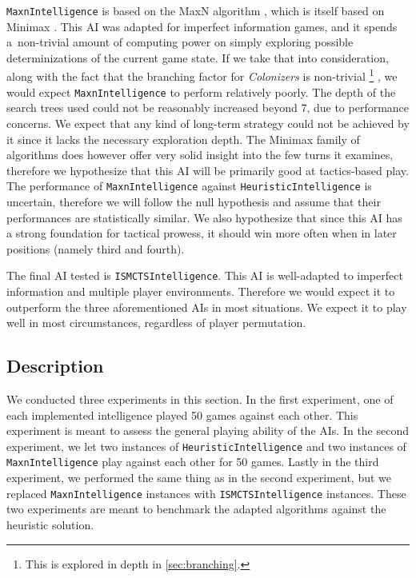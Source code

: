 \texttt{MaxnIntelligence} is based on the MaxN algorithm \cite{Luckhardt86}, which
is itself based on Minimax \cite{Millington09}. This AI was adapted for imperfect
information games, and it spends a~non-trivial amount of computing power
on simply exploring possible determinizations of the current game state.
If we take that into consideration, along with the fact that the branching factor
for \emph{Colonizers} is non-trivial
\footnote{This is explored in depth in \autoref{sec:branching}.}
, we would expect \texttt{MaxnIntelligence}
to perform relatively poorly. The depth of the search trees used could not be
reasonably increased beyond 7, due to performance concerns. We expect that any kind of
long-term strategy could not be achieved by it since it lacks the necessary
exploration depth. The Minimax family of algorithms does however offer very
solid insight into the few turns it examines, therefore we hypothesize that this AI will be
primarily good at tactics-based play. The performance of \texttt{MaxnIntelligence}
against \texttt{HeuristicIntelligence} is uncertain, therefore we will follow the null
hypothesis and assume that their performances are statistically similar.
We also hypothesize that since this AI has a strong foundation for tactical prowess,
it should win more often when in later positions (namely third and fourth).

The final AI tested is \texttt{ISMCTSIntelligence}. This AI is well-adapted to
imperfect information and multiple player environments. Therefore we would expect
it to outperform the three aforementioned AIs in most situations. We expect it
to play well in most circumstances, regardless of player permutation.

\subsection{Description}

We conducted three experiments in this section. In the first experiment, one of each
implemented intelligence played 50 games against each other. This experiment is meant
to assess the general playing ability of the AIs. In the second experiment, we
let two instances of \texttt{HeuristicIntelligence} and two instances of
\texttt{MaxnIntelligence} play against each other for 50 games.
Lastly in the third experiment, we performed the same thing as in the second experiment,
but we replaced \texttt{MaxnIntelligence} instances with \texttt{ISMCTSIntelligence}
instances. These two experiments are meant to benchmark the adapted algorithms
against the heuristic solution.

